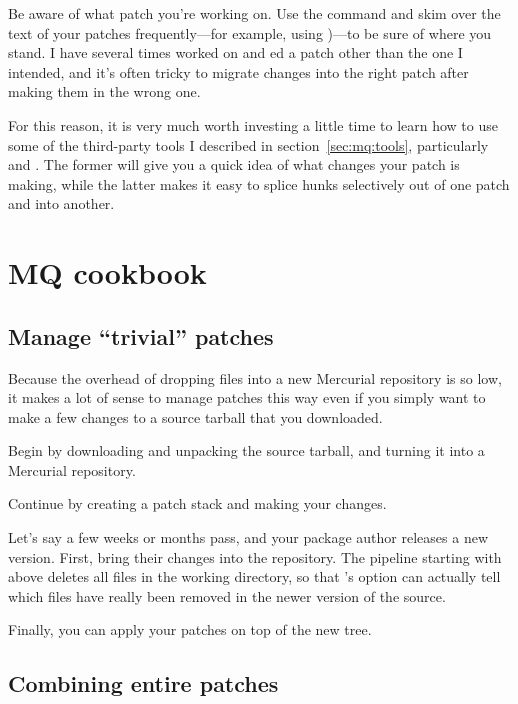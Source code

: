 Be aware of what patch you're working on.  Use the 
command and skim over the text of your patches frequently---for
example, using )---to be sure of where
you stand.  I have several times worked on and ed a
patch other than the one I intended, and it's often tricky to migrate
changes into the right patch after making them in the wrong one.

For this reason, it is very much worth investing a little time to
learn how to use some of the third-party tools I described in
section~\ref{sec:mq:tools}, particularly  and
.  The former will give you a quick idea of what
changes your patch is making, while the latter makes it easy to splice
hunks selectively out of one patch and into another.

\section{MQ cookbook}

\subsection{Manage ``trivial'' patches}

Because the overhead of dropping files into a new Mercurial repository
is so low, it makes a lot of sense to manage patches this way even if
you simply want to make a few changes to a source tarball that you
downloaded.

Begin by downloading and unpacking the source tarball,
and turning it into a Mercurial repository.

Continue by creating a patch stack and making your changes.

Let's say a few weeks or months pass, and your package author releases
a new version.  First, bring their changes into the repository.
The pipeline starting with  above deletes all files in
the working directory, so that 's
 option can actually tell which files have
really been removed in the newer version of the source.

Finally, you can apply your patches on top of the new tree.

\subsection{Combining entire patches}
\label{sec:mq:combine}

